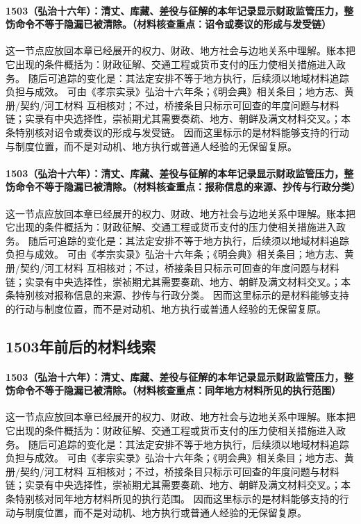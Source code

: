 \paragraph{1503（弘治十六年）：清丈、库藏、差役与征解的本年记录显示财政监管压力，整饬命令不等于隐漏已被清除。（材料核查重点：诏令或奏议的形成与发受链）} 这一节点应放回本章已经展开的权力、财政、地方社会与边地关系中理解。账本把它出现的条件概括为：财政征解、交通工程或货币支付的压力使相关措施进入政务。 随后可追踪的变化是：其法定安排不等于地方执行，后续须以地域材料追踪负担与成效。 可由《孝宗实录》弘治十六年条；《明会典》相关条目；地方志、黄册/契约/河工材料 互相核对；不过，桥接条目只标示可回查的年度问题与材料链；实录有中央选择性，崇祯期尤其需要奏疏、地方、朝鲜及满文材料交叉。；本条特别核对诏令或奏议的形成与发受链。 因而这里标示的是材料能够支持的行动与制度位置，而不是对动机、地方执行或普通人经验的无保留复原。

\paragraph{1503（弘治十六年）：清丈、库藏、差役与征解的本年记录显示财政监管压力，整饬命令不等于隐漏已被清除。（材料核查重点：报称信息的来源、抄传与行政分类）} 这一节点应放回本章已经展开的权力、财政、地方社会与边地关系中理解。账本把它出现的条件概括为：财政征解、交通工程或货币支付的压力使相关措施进入政务。 随后可追踪的变化是：其法定安排不等于地方执行，后续须以地域材料追踪负担与成效。 可由《孝宗实录》弘治十六年条；《明会典》相关条目；地方志、黄册/契约/河工材料 互相核对；不过，桥接条目只标示可回查的年度问题与材料链；实录有中央选择性，崇祯期尤其需要奏疏、地方、朝鲜及满文材料交叉。；本条特别核对报称信息的来源、抄传与行政分类。 因而这里标示的是材料能够支持的行动与制度位置，而不是对动机、地方执行或普通人经验的无保留复原。

\subsection{1503年前后的材料线索}

\paragraph{1503（弘治十六年）：清丈、库藏、差役与征解的本年记录显示财政监管压力，整饬命令不等于隐漏已被清除。（材料核查重点：同年地方材料所见的执行范围）} 这一节点应放回本章已经展开的权力、财政、地方社会与边地关系中理解。账本把它出现的条件概括为：财政征解、交通工程或货币支付的压力使相关措施进入政务。 随后可追踪的变化是：其法定安排不等于地方执行，后续须以地域材料追踪负担与成效。 可由《孝宗实录》弘治十六年条；《明会典》相关条目；地方志、黄册/契约/河工材料 互相核对；不过，桥接条目只标示可回查的年度问题与材料链；实录有中央选择性，崇祯期尤其需要奏疏、地方、朝鲜及满文材料交叉。；本条特别核对同年地方材料所见的执行范围。 因而这里标示的是材料能够支持的行动与制度位置，而不是对动机、地方执行或普通人经验的无保留复原。

